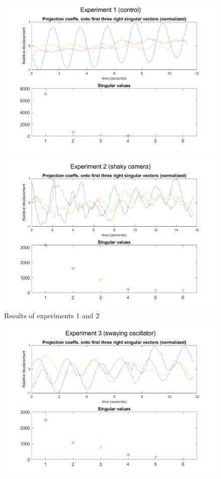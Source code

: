 \documentclass{article}
\begin{document}
\begin{figure}[!h]
	\centering
	\includegraphics[scale=0.62]{figs/fig1}
\end{figure}
\begin{figure}[!h]
	\centering
	\includegraphics[scale=0.62]{figs/fig2}
	\caption{Results of experiments 1 and 2}
\end{figure}
\begin{figure}[!h]
	\centering
	\includegraphics[scale=0.62]{figs/fig3}
\end{figure}
\end{document}
